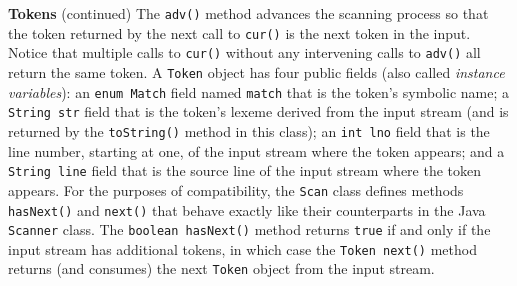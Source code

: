 \begin{minipage}[t]{\sw}
\slidenumber
\LARGE
{\bf Tokens} (continued)\exx
The \verb'adv()' method advances the scanning process
so that the token returned by the next call to \verb'cur()'
is the next token in the input.
Notice that multiple calls to \verb'cur()'
without any intervening calls to \verb'adv()'
all return the same token.\exx
A \verb'Token' object has four public fields
(also called {\em instance variables}):
an \verb'enum Match' field named \verb'match'
that is the token's symbolic name;
a \verb'String str' field that is the token's lexeme derived
from the input stream (and is returned by
the \verb'toString()' method in this class);
an \verb'int lno' field that is the line number,
starting at one, of the input stream where the token appears;
and a \verb'String line' field that is
the source line of the input stream where the token appears.\exx
For the purposes of compatibility,
the \verb'Scan' class defines methods \verb'hasNext()' and \verb'next()'
that behave exactly like their counterparts in the Java \verb'Scanner' class.
The \verb'boolean hasNext()' method returns \verb'true'
if and only if the input stream has additional tokens,
in which case the \verb'Token next()' method returns (and consumes)
the next \verb'Token' object from the input stream.
\end{minipage}
\clearpage
